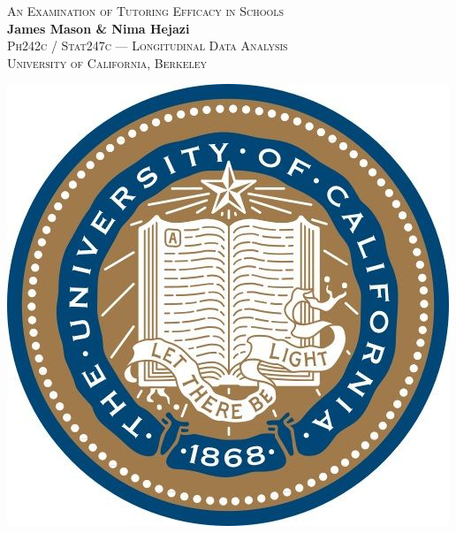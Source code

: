 \documentclass[a0,landscape]{a0poster}
\begin{document}


\begin{minipage}[b]{0.55\linewidth}
\Huge{\color{NavyBlue} \scshape An Examination of Tutoring Efficacy in Schools} \\ %
\huge\textbf{James Mason \& Nima Hejazi}\\ %
\Large{\scshape Ph242c / Stat247c --- Longitudinal Data Analysis} \\ %
\LARGE{\scshape University of California, Berkeley}\\ %
\end{minipage}
%
\hfill
\includegraphics[scale=0.5]{logo_cal.jpg} 

\vspace{0.5cm} %
\end{document}
